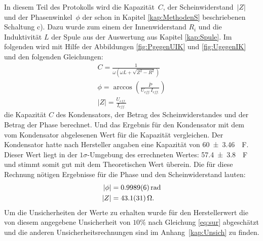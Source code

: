 In diesem Teil des Protokolls wird die Kapazität~$C$, der Scheinwiderstand~$|Z|$ und der Phasenwinkel~$\phi $ der schon in Kapitel \ref{kap:MethodenS} beschriebenen Schaltung c). 
Dazu wurde zum einem der Innenwiderstand $R_i$ und die Induktivität $L$ der Spule aus der Auswertung aus Kapitel \ref{kap:Spule}.
Im folgenden wird mit Hilfe der Abbildungen \ref{fig:PgegenUIK} und \ref{fig:UgegenIK}
und den folgenden Gleichungen:
\begin{align}
C=\frac{1}{\omega (\omega L+\sqrt{Z^2-R^2})}\\	
\phi = \arccos\left(\frac{\bar{P}}{U_{eff.}I_{eff.}}\right)\\
	|Z|=\frac{U_{eff.}}{I_{eff.}}
\end{align}
die Kapazität $C$ des Kondensators, der Betrag des Scheinwiderstandes und der Betrag der Phase berechnet. Und das Ergebnis für den Kondensator mit dem vom Kondensator abgelesenen Wert für die Kapazität vergleichen.
Der Kondensator hatte nach Hersteller angaben eine Kapazität von \SI{60+-3.46}{\mu F}.
Dieser Wert liegt in der $1\sigma$-Umgebung des errechneten Wertes: \SI{57.4+-3.8}{\mu F} und stimmt somit gut mit dem Theoretischen Wert überein.
Die für diese Rechnung nötigen Ergebnisse für die Phase und den Scheinwiderstand lauten:
\begin{align}
	|\phi| &=\SI{0.9989+-0.0006}{rad}\\
	|Z| &=\SI{43.1+-3.1}{\ohm}.
\end{align}
Um die Unsicherheiten der Werte zu erhalten wurde für den Herstellerwert die von diesem angegebene Unsicherheit von $10\%$ nach Gleichung
\ref{eq:sur} abgeschätzt und die anderen Unsicherheitsrechnungen sind im Anhang~\ref{kap:Unsich} zu finden.

